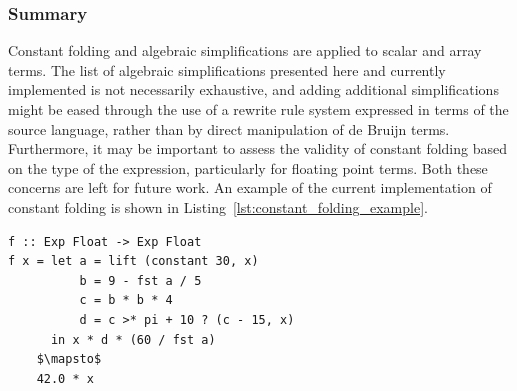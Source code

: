 \subsubsection{Summary}

Constant folding and algebraic simplifications are applied to scalar and array
terms. The list of algebraic simplifications presented here and currently
implemented is not necessarily exhaustive, and adding additional simplifications
might be eased through the use of a rewrite rule system expressed in terms of
the source language, rather than by direct manipulation of de Bruijn
terms. Furthermore, it may be important to assess the validity of constant
folding based on the type of the expression, particularly for floating point
terms. Both these concerns are left for future work. An example of the current
implementation of constant folding is shown in
Listing~\ref{lst:constant_folding_example}.

\begin{lstlisting}[style=haskell_float
    ,mathescape
    ,label=lst:constant_folding_example
    ,caption={Example of constant expression evaluation}]
f :: Exp Float -> Exp Float
f x = let a = lift (constant 30, x)
          b = 9 - fst a / 5
          c = b * b * 4
          d = c >* pi + 10 ? (c - 15, x)
      in x * d * (60 / fst a)
    $\mapsto$
    42.0 * x
\end{lstlisting}


%
%
%

